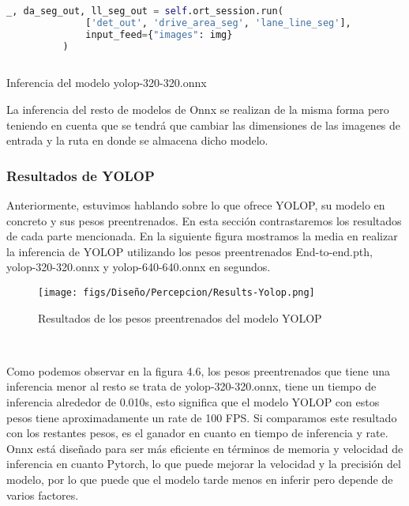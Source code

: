         \begin{code}[h]
          \begin{lstlisting}[language=Python]
            _, da_seg_out, ll_seg_out = self.ort_session.run(
              ['det_out', 'drive_area_seg', 'lane_line_seg'],
              input_feed={"images": img}
          )
        
          \end{lstlisting}
          \caption[Inferencia del modelo yolop-320-320.onnx]{Inferencia del modelo yolop-320-320.onnx}
          \label{cod:codejemplo}
          \end{code}  

        La inferencia del resto de modelos de Onnx se realizan de la misma forma pero teniendo en cuenta que se tendrá que cambiar las dimensiones de las imagenes de entrada y la ruta
        en donde se almacena dicho modelo. 


\subsubsection{Resultados de YOLOP }
\label{sec:resultados}
Anteriormente, estuvimos hablando sobre lo que ofrece YOLOP, su modelo en concreto y sus pesos preentrenados. En esta sección contrastaremos los resultados de cada parte mencionada. \newline
En la siguiente figura mostramos la media en realizar la inferencia de YOLOP utilizando los pesos preentrenados End-to-end.pth, yolop-320-320.onnx y yolop-640-640.onnx en segundos.

\begin{figure} [H]
  \begin{center}
    \texttt{[image: figs/Diseño/Percepcion/Results-Yolop.png]}
  \end{center}
  \caption{Resultados de los pesos preentrenados del modelo YOLOP}
  \label{fig:pesos_preentrenados}
\end{figure}\

Como podemos observar en la figura 4.6, los pesos preentrenados que tiene una inferencia menor al resto se trata de yolop-320-320.onnx, tiene un tiempo de inferencia alrededor de 0.010s, esto
significa que el modelo YOLOP con estos pesos tiene aproximadamente un rate de 100 FPS. Si comparamos este resultado con los restantes pesos, es el ganador en cuanto 
en tiempo de inferencia y rate. 
Onnx está diseñado para ser más eficiente en términos de memoria y velocidad de inferencia en cuanto Pytorch, lo que puede mejorar la velocidad y la precisión
del modelo, por lo que puede que el modelo tarde menos en inferir pero depende de varios factores. 

